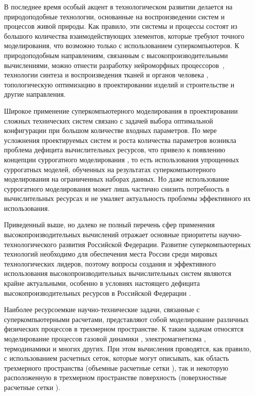 В последнее время особый акцент в технологическом развитии делается на природоподобные технологии, основанные на воспроизведении систем и процессов живой природы.
Как правило, эти системы и процессы состоят из большого количества взаимодействующих элементов, которые требуют точного моделирования, что возможно только с использованием суперкомпьютеров.
К природоподобным направлениям, связанным с высокопроизводительными вычислениями, можно отнести разработку нейроморфных процессоров~\cite{Rhodes2019SuperNuero}, технологии синтеза и воспроизведения тканей и органов человека \cite{Wang2012SuperTissues}, топологическую оптимизацию в проектировании изделий и строительстве \cite{Fedchikov2024SuperBim} и другие направления.

Широкое применение суперкомпьютерного моделирования в проектировании сложных технических систем связано с задачей выбора оптимальной конфигурации при большом количестве входных параметров.
По мере усложнения проектируемых систем и роста количества параметров возникла проблема дефицита вычислительных ресурсов, что привело к появлению концепции суррогатного моделирования \cite{Jiang2020Surrogate,Barcenas2023Surrogate,Catalani2024Surrogate}, то есть использования упрощенных суррогатных моделей, обученных на результатах суперкомпьютерного моделирования на ограниченных наборах данных.
Но даже использование суррогатного моделирования может лишь частично снизить потребность в вычислительных ресурсах и не умаляет актуальность проблемы эффективного их использования.

Приведенный выше, но далеко не полный перечень сфер применения высокопроизводительных вычислений отражает основные приоритеты научно-технологического развития Российской Федерации.
Развитие суперкомпьютерных технологий необходимо для обеспечения места России среди мировых технологических лидеров, поэтому вопросы создания и эффективного использования высокопроизводительных вычислительных систем являются крайне актуальными, особенно в условиях настоящего дефицита высокопроизводительных ресурсов в Российской Федерации \cite{Voevodin2021SuperRussia}.

Наиболее ресурсоемкие научно-технические задачи, связанные с суперкомпьютерными расчетами, представляют собой моделирование различных физических процессов в трехмерном пространстве.
К таким задачам относятся моделирование процессов газовой динамики \cite{Lobanova2023GeneralGas}, электромагнетизма \cite{Taboada2013GeneralElectro}, термодинамики \cite{Liu2020GeneralThermo} и многих других.
При этом вычисления проводятся, как правило, с использованием расчетных сеток, которые могут описывать, как область трехмерного пространства (объемные расчетные сетки \cite{Kudryavzeva2014GeneralVolumeMesh}), так и некоторую расположенную в трехмерном пространстве поверхность (поверхностные расчетные сетки \cite{Zheleznyakova2016GeneralSurfMesh}).

